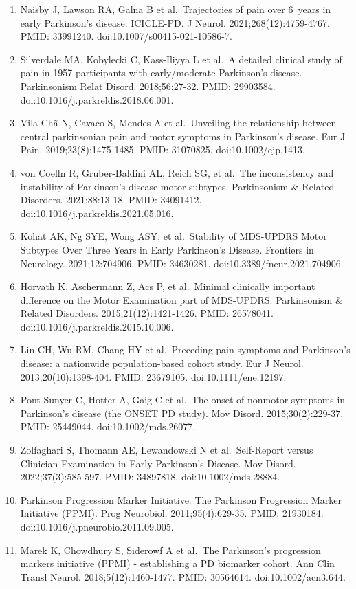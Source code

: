 \documentclass[
  english,
  12pt,
]{article}
\begin{document}
\begin{enumerate}
\item
  Naisby J, Lawson RA, Galna B et al.~Trajectories of pain over 6~years in early Parkinson's disease: ICICLE-PD. J Neurol. 2021;268(12):4759-4767. PMID: 33991240. doi:10.1007/s00415-021-10586-7.
\item
  Silverdale MA, Kobylecki C, Kass-Iliyya L et al.~A detailed clinical study of pain in 1957 participants with early/moderate Parkinson's disease. Parkinsonism Relat Disord. 2018;56:27-32. PMID: 29903584. doi:10.1016/j.parkreldis.2018.06.001.
\item
  Vila-Chã N, Cavaco S, Mendes A et al.~Unveiling the relationship between central parkinsonian pain and motor symptoms in Parkinson's disease. Eur J Pain. 2019;23(8):1475-1485. PMID: 31070825. doi:10.1002/ejp.1413.
\item
  von Coelln R, Gruber-Baldini AL, Reich SG, et al.~The inconsistency and instability of Parkinson's disease motor subtypes. Parkinsonism \& Related Disorders. 2021;88:13-18. PMID: 34091412. doi:10.1016/j.parkreldis.2021.05.016.
\item
  Kohat AK, Ng SYE, Wong ASY, et al.~Stability of MDS-UPDRS Motor Subtypes Over Three Years in Early Parkinson's Disease. Frontiers in Neurology. 2021;12:704906. PMID: 34630281. doi:10.3389/fneur.2021.704906.
\item
  Horvath K, Aschermann Z, Acs P, et al.~Minimal clinically important difference on the Motor Examination part of MDS-UPDRS. Parkinsonism \& Related Disorders. 2015;21(12):1421-1426. PMID: 26578041. doi:10.1016/j.parkreldis.2015.10.006.
\item
  Lin CH, Wu RM, Chang HY et al.~Preceding pain symptoms and Parkinson's disease: a nationwide population-based cohort study. Eur J Neurol. 2013;20(10):1398-404. PMID: 23679105. doi:10.1111/ene.12197.
\item
  Pont-Sunyer C, Hotter A, Gaig C et al.~The onset of nonmotor symptoms in Parkinson's disease (the ONSET PD study). Mov Disord. 2015;30(2):229-37. PMID: 25449044. doi:10.1002/mds.26077.
\item
  Zolfaghari S, Thomann AE, Lewandowski N et al.~Self-Report versus Clinician Examination in Early Parkinson's Disease. Mov Disord. 2022;37(3):585-597. PMID: 34897818. doi:10.1002/mds.28884.
\item
  Parkinson Progression Marker Initiative. The Parkinson Progression Marker Initiative (PPMI). Prog Neurobiol. 2011;95(4):629-35. PMID: 21930184. doi:10.1016/j.pneurobio.2011.09.005.
\item
  Marek K, Chowdhury S, Siderowf A et al.~The Parkinson's progression markers initiative (PPMI) - establishing a PD biomarker cohort. Ann Clin Transl Neurol. 2018;5(12):1460-1477. PMID: 30564614. doi:10.1002/acn3.644.
\end{enumerate}
\end{document}

